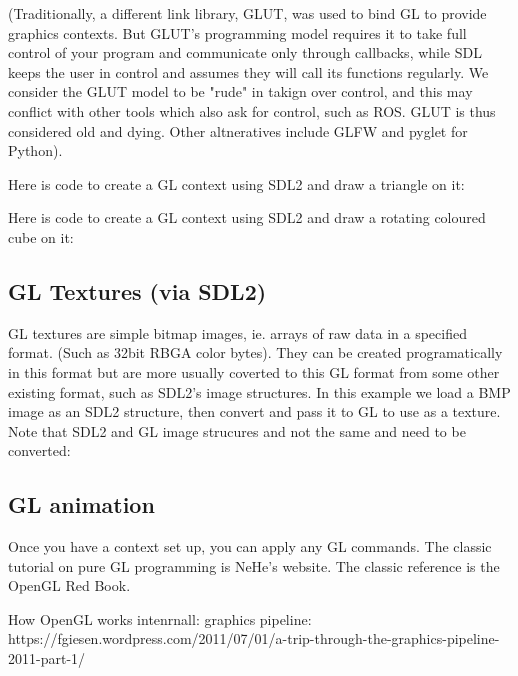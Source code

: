 \documentclass[oneside,english]{scrbook}
\begin{document}
(Traditionally, a different link library, GLUT, was used to bind GL to provide graphics contexts. But GLUT's programming model requires it to take full control of your program and communicate only through callbacks, while SDL keeps the user in control and assumes they will call its functions regularly. We consider the GLUT model to be "rude" in takign over control, and this may conflict with other tools which also ask for control, such as ROS.  GLUT is thus considered old and dying.  Other altneratives include GLFW and pyglet for Python).

Here is code to create a GL context using SDL2 and draw a triangle on it:




Here is code to create a GL context using SDL2 and draw a rotating coloured cube on it:




\subsection{GL Textures (via SDL2)}

GL textures are simple bitmap images, ie. arrays of raw data in a specified format. (Such as 32bit RBGA color bytes).  They can be created programatically in this format but are more usually coverted to this GL format from some other existing format, such as SDL2's image structures.   In this example we load a BMP image as an SDL2 structure, then convert and pass it to GL to use as a texture. Note that SDL2 and GL image strucures and not the same and need to be converted:






\subsection{GL animation}

Once you have a context set up, you can apply any GL commands. The classic tutorial on pure GL programming is NeHe's website.  The classic reference is the OpenGL Red Book.

How OpenGL works intenrnall: graphics pipeline: https://fgiesen.wordpress.com/2011/07/01/a-trip-through-the-graphics-pipeline-2011-part-1/
\end{document}
